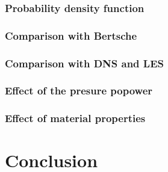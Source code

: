 \documentclass[12pt,oneside]{jbook}
\begin{document}
\subsection{Probability density function}


\subsection{Comparison with Bertsche}
\subsection{Comparison with DNS and LES}
\subsection{Effect of the presure popower}
\subsection{Effect of material properties}

\chapter{Conclusion}


\appendix
%



\end{document}

